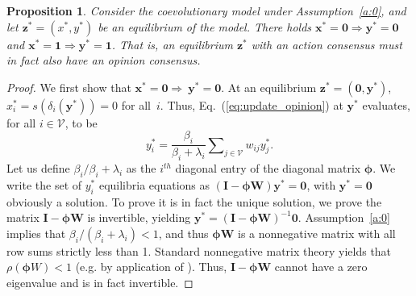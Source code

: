 \documentclass[letterpaper, 10 pt, conference]{ieeeconf}  %
\newcommand{\vect}[1]{\boldsymbol{#1}}
\newcommand{\mat}[1]{\boldsymbol{#1}}
\newtheorem{proposition}{Proposition}
\renewcommand{\eqref}[1]{Eq.~(\ref{#1})}  %
\begin{document}
\begin{proposition}\label{prop:consensus}
    Consider the coevolutionary model under Assumption~\ref{a:0}, and let $\vect{z}^*=(x^*,y^*)$ be an equilibrium of the model. There holds $\vect x^* = \vect 0 \Rightarrow \vect y^* = \vect 0$ and $\vect x^* = \vect 1 \Rightarrow \vect y^* = \vect 1$. That is, an equilibrium $\vect z^*$ with an action consensus must in fact also have an opinion consensus.  
\end{proposition}
\begin{proof}
    We first show that $\vect{x}^*= \vect{0} \Rightarrow~\vect{y}^*=\vect{0}$. At an equilibrium $\vect z^* = (\vect 0, \vect y^*)$, $x_i^* = s(\delta_i(\vect y^*)) = 0$ for all~$i$. Thus, \eqref{eq:update_opinion} at $\vect y^*$ evaluates, for all $i\in\mathcal V$, to be
    \begin{equation}
        y_i^* = \dfrac{\beta_i}{\beta_i+\lambda_i}\sum\nolimits_{j\in\mathcal{V}}w_{ij}y_j^*.
    \end{equation}
    Let us define $\beta_i/\beta_i+\lambda_i$ as the $i^{th}$ diagonal entry of the diagonal matrix $\mat\phi$. 
    We write the set of $y_i^*$ equilibria equations as $(\mat I- \mat{\phi}\mat{W})\vect{y}^* = \vect 0$, with
    $\vect y^* = \vect 0$ obviously a solution. To prove it is in fact the unique solution, we prove the matrix $\mat{I}-\mat{\phi}\mat{W}$ is invertible, yielding $\vect{y}^* = \left(\mat{I} - \mat{\phi}\mat{W}\right)^{-1}\vect 0$. Assumption~\ref{a:0} implies that $\beta_i/(\beta_i+\lambda_i) < 1$, and thus $\mat{\phi W}$ is a nonnegative matrix with all row sums strictly less than 1. Standard nonnegative matrix theory yields that $\rho({\mat \phi W}) < 1$ (e.g. by application of \cite[Corollary 8.1.29]{horn2012matrixbook}). Thus, $\mat I - \mat{\phi W}$ cannot have a zero eigenvalue and is in fact invertible.
    

\end{proof}
\end{document}
